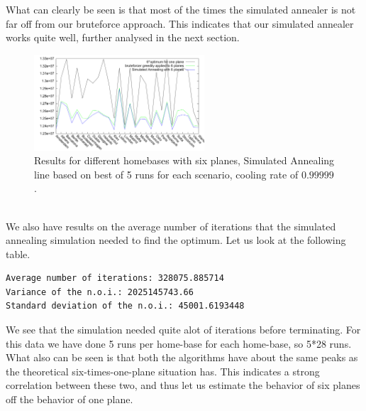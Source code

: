 \documentclass[journal]{IEEEtran}
\begin{document}
What can clearly be seen is that most of the times the simulated annealer is not far off from our bruteforce approach. This indicates that our simulated annealer works quite well, further analysed in the next section. \\
\begin{figure}[!h]
\centering
\includegraphics[width=2.5in]{different_homebases}
\caption{Results for different homebases with six planes, Simulated Annealing line based on best of 5 runs for each scenario, cooling rate of $0.99999$.}
\label{fig:different_homebase_six_planes}
\end{figure}
\\
We also have results on the average number of iterations that the simulated annealing simulation needed to find the optimum. Let us look at the following table.
\begin{lstlisting}
Average number of iterations: 328075.885714
Variance of the n.o.i.: 2025145743.66
Standard deviation of the n.o.i.: 45001.6193448
\end{lstlisting}
We see that the simulation needed quite alot of iterations before terminating. For this data we have done 5 runs per home-base for each home-base, so 5*28 runs. \\
What also can be seen is that both the algorithms have about the same peaks as the theoretical six-times-one-plane situation has. This indicates a strong correlation between these two, and thus let us estimate the behavior of six planes off the behavior of one plane.
\\
\end{document}
